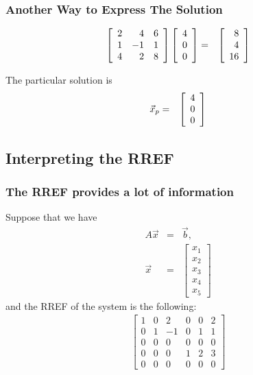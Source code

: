 \begin{frame}
  \frametitle{Another Way to Express The Solution}
  
  \begin{eqnarray*}
    \left[ \begin{array}{rrr} 2 & 4 & 6 \\ 1 & -1 & 1 \\ 4 & 2 & 8 \end{array} \right] \left[ \begin{array}{r} 4 \\ 0 \\ 0 \end{array} \right] 
    & = & \left[ \begin{array}{r} 8 \\ 4 \\ 16 \end{array} \right]
  \end{eqnarray*}

  The particular solution is 
  \begin{eqnarray*}
    \vec{x}_p & = & \left[ \begin{array}{r} 4 \\ 0 \\ 0 \end{array} \right] 
  \end{eqnarray*}


\end{frame}

\subsection{Interpreting the RREF}

\begin{frame}
  \frametitle{The RREF provides a lot of information}

  Suppose that we have 
  \begin{eqnarray*}
    A\vec{x} & = & \vec{b}, \\
    \vec{x} & = & 
    \left[ \begin{array}{r}x_1\\x_2\\x_3\\x_4\\x_5\end{array}\right]
  \end{eqnarray*}
  and the RREF of the system is the following:
  \begin{eqnarray*}
    \left[
      \begin{array}{rrrrr|r}
        1 & 0 & 2 & 0 & 0 & 2 \\
        0 & 1 & -1 & 0 & 1 & 1 \\
        0 & 0 & 0 & 0 & 0 & 0 \\
        0 & 0 & 0 & 1 & 2 & 3 \\
        0 & 0 & 0 & 0 & 0 & 0 
      \end{array}
    \right]
  \end{eqnarray*}

\end{frame}


